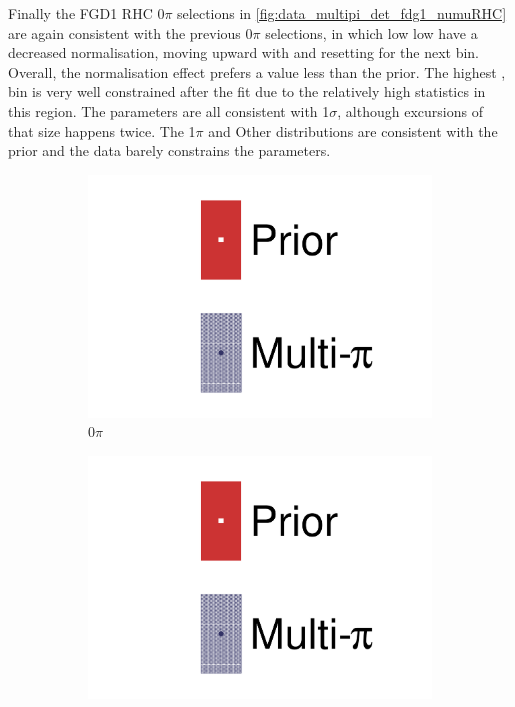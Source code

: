 Finally the FGD1 \numu RHC 0$\pi$ selections in \autoref{fig:data_multipi_det_fdg1_numuRHC} are again consistent with the previous 0$\pi$ selections, in which low \cosmu low \pmu have a decreased normalisation, moving upward with \pmu and resetting for the next \cosmu bin. Overall, the normalisation effect prefers a value less than the prior. The highest \cosmu, \pmu bin is very well constrained after the fit due to the relatively high statistics in this region. The parameters are all consistent with 1$\sigma$, although excursions of that size happens twice. The 1$\pi$ and Other distributions are consistent with the prior and the data barely constrains the parameters.
\begin{figure}[h]
	\centering
	\begin{subfigure}[t]{0.32\textwidth}
		\includegraphics[width=\textwidth,page=52, trim={0mm 0mm 0mm 0mm}, clip]{figures/mach3/2018/data/2018a_FixedCov_RedCov_Mpi_Data_merge_drawPar_withDet}
		\caption{0$\pi$}
	\end{subfigure}
	\begin{subfigure}[t]{0.32\textwidth}
		\includegraphics[width=\textwidth,page=53, trim={0mm 0mm 0mm 0mm}, clip]{figures/mach3/2018/data/2018a_FixedCov_RedCov_Mpi_Data_merge_drawPar_withDet}

\end{subfigure}
\end{figure}
